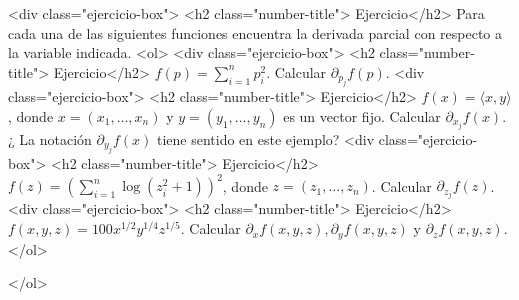 \documentclass{article}
\theoremstyle{definition}
\begin{document}
         <div class="ejercicio-box"> <h2 class="number-title"> Ejercicio</h2> Para cada una de las siguientes funciones encuentra la derivada parcial con respecto a la variable indicada.
                <ol>
                <div class="ejercicio-box"> <h2 class="number-title"> Ejercicio</h2> $f(p)=\sum_{i=1}^n p_i^2$. Calcular $\partial_{p_j}f(p)$.
                <div class="ejercicio-box"> <h2 class="number-title"> Ejercicio</h2> $f(x)=\langle x, y \rangle$, donde $x=(x_1,\dots, x_n)$ y $y=(y_1,\dots, y_n)$
                  es un vector fijo. Calcular
                  $\partial_{x_j}f(x)$. ¿ La notación $\partial_{y_j}f(x)$ tiene sentido en este ejemplo?
                <div class="ejercicio-box"> <h2 class="number-title"> Ejercicio</h2> $f(z)=\left( \sum_{i=1}^n \log(z_i^2+1) \right)^2$,
                  donde $z=(z_1,\dots, z_n)$. Calcular $\partial_{z_j}f(z)$.
                <div class="ejercicio-box"> <h2 class="number-title"> Ejercicio</h2> $f(x,y,z)=100x^{1/2}y^{1/4}z^{1/5}$.
                  Calcular $\partial_xf(x,y,z), \partial_yf(x,y,z)$ y $\partial_zf(x,y,z)$.
                </ol>
       
                </ol>
   
       
\end{document}
